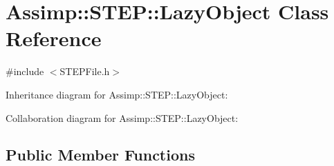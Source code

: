 \hypertarget{class_assimp_1_1_s_t_e_p_1_1_lazy_object}{\section{Assimp\+:\+:S\+T\+E\+P\+:\+:Lazy\+Object Class Reference}
\label{class_assimp_1_1_s_t_e_p_1_1_lazy_object}
}


{\ttfamily \#include $<$S\+T\+E\+P\+File.\+h$>$}



Inheritance diagram for Assimp\+:\+:S\+T\+E\+P\+:\+:Lazy\+Object\+:


Collaboration diagram for Assimp\+:\+:S\+T\+E\+P\+:\+:Lazy\+Object\+:
\subsection*{Public Member Functions}
